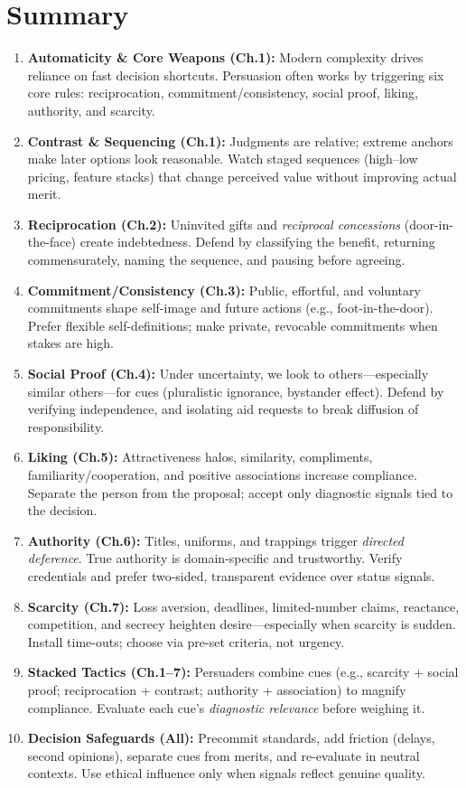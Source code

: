 \section*{Summary}
\begin{enumerate}
    \item \textbf{Automaticity \& Core Weapons (Ch.1):} Modern complexity drives reliance on fast decision shortcuts. Persuasion often works by triggering six core rules: reciprocation, commitment/consistency, social proof, liking, authority, and scarcity.
    \item \textbf{Contrast \& Sequencing (Ch.1):} Judgments are relative; extreme anchors make later options look reasonable. Watch staged sequences (high–low pricing, feature stacks) that change perceived value without improving actual merit.
    \item \textbf{Reciprocation (Ch.2):} Uninvited gifts and \emph{reciprocal concessions} (door-in-the-face) create indebtedness. Defend by classifying the benefit, returning commensurately, naming the sequence, and pausing before agreeing.
    \item \textbf{Commitment/Consistency (Ch.3):} Public, effortful, and voluntary commitments shape self-image and future actions (e.g., foot-in-the-door). Prefer flexible self-definitions; make private, revocable commitments when stakes are high.
    \item \textbf{Social Proof (Ch.4):} Under uncertainty, we look to others—especially similar others—for cues (pluralistic ignorance, bystander effect). Defend by verifying independence, and isolating aid requests to break diffusion of responsibility.
    \item \textbf{Liking (Ch.5):} Attractiveness halos, similarity, compliments, familiarity/cooperation, and positive associations increase compliance. Separate the person from the proposal; accept only diagnostic signals tied to the decision.
    \item \textbf{Authority (Ch.6):} Titles, uniforms, and trappings trigger \emph{directed deference}. True authority is domain-specific and trustworthy. Verify credentials and prefer two-sided, transparent evidence over status signals.
    \item \textbf{Scarcity (Ch.7):} Loss aversion, deadlines, limited-number claims, reactance, competition, and secrecy heighten desire—especially when scarcity is sudden. Install time-outs; choose via pre-set criteria, not urgency.
    \item \textbf{Stacked Tactics (Ch.1–7):} Persuaders combine cues (e.g., scarcity + social proof; reciprocation + contrast; authority + association) to magnify compliance. Evaluate each cue’s \emph{diagnostic relevance} before weighing it.
    \item \textbf{Decision Safeguards (All):} Precommit standards, add friction (delays, second opinions), separate cues from merits, and re-evaluate in neutral contexts. Use ethical influence only when signals reflect genuine quality.
\end{enumerate}
